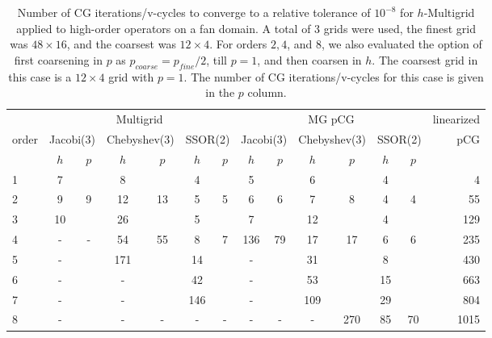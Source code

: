 \begin{table}
  \caption{\label{tab:fan} Number of CG iterations/v-cycles to converge to a relative tolerance of $10^{-8}$ for $h$-Multigrid applied to high-order operators on a fan domain. A total of 3 grids were used, the finest grid was $48\times 16$, and the coarsest was $12\times 4$. For orders $2,4$, and $8$, we also evaluated the option of first coarsening in $p$ as $p_{coarse} = p_{fine}/2$, till $p=1$, and then coarsen in $h$. The coarsest grid in this case is a $12\times 4$ grid with $p=1$. The number of CG iterations/v-cycles for this case is given in the $p$ column.}
		\centering
    \begin{tabular}{|l|c|c|c|c|c|c|c|c|c|c|c|c|r|} 
\hline
		 & \multicolumn{6}{c|}{Multigrid} & \multicolumn{6}{c|}{MG pCG} &          linearized \\
		\cline{2-13}
		order &  \multicolumn{2}{c|}{\scriptsize  Jacobi(3)} &  \multicolumn{2}{c|}{\scriptsize Chebyshev(3)} & \multicolumn{2}{c|}{\scriptsize  SSOR(2)} & \multicolumn{2}{c|}{\scriptsize Jacobi(3)} &  \multicolumn{2}{c|}{\scriptsize Chebyshev(3)} & \multicolumn{2}{c|}{\scriptsize SSOR(2)} & pCG\\
				 \hline
				  & $h$ & $p$ & $h$ & $p$& $h$ & $p$& $h$ & $p$& $h$ & $p$& $h$ & $p$& \\
				  \cline{2-13}
         
 1 &       7 &       &         8 &       &       4 &       &         5 &        &         6 &      &             4 &     &  4  \\
 2 &       9 &   9   &        12 &  13   &       5 &   5   &         6 &   6    &         7 &  8   &             4 &  4  &  55  \\
 3 &      10 &       &        26 &       &       5 &       &         7 &        &        12 &      &             4 &     &  129  \\
 4 &       - &   -   &        54 &  55   &       8 &   7   &       136 &  79    &        17 & 17   &             6 &  6  &  235  \\
 5 &       - &       &       171 &       &      14 &       &         - &        &        31 &      &             8 &     &  430  \\
 6 &       - &       &         - &       &      42 &       &         - &        &        53 &      &            15 &     &  663  \\
 7 &       - &       &         - &       &     146 &       &         - &        &       109 &      &            29 &     &  804  \\
 8 &       - &       &         - &   -   &       - &   -   &         - &   -    &        -  & 270  &            85 & 70  &  1015  \\
\hline
	  \end{tabular}
\end{table}


